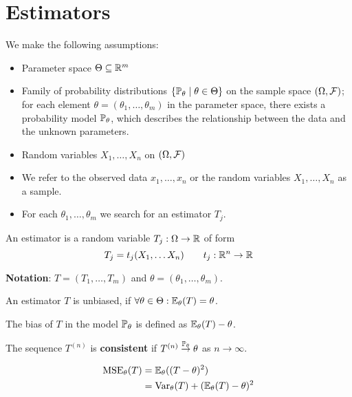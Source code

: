 \section{Estimators}
We make the following assumptions:
\begin{itemize}
  \item Parameter space \(\Theta \subseteq \R^m\)
  \item Family of probability distributions \(\{\P_\theta \mid \theta \in \Theta\}\) on the sample space \((\O, \F)\); for each element \(\theta = (\theta_1, \ldots, \theta_m)\) in the parameter space, there exists a probability model \(\P_\theta\), which describes the relationship between the data and the unknown parameters.
  \item Random variables \(X_1, \ldots, X_n\) on \((\O, \mathcal{F})\)
  \item We refer to the observed data \(x_1, \ldots, x_n\) or the random variables \(X_1, \ldots, X_n\) as a sample.
  \item For each \(\theta_1, \ldots, \theta_m\) we search for an estimator \(T_j\).
\end{itemize}

\begin{definition*}[Estimator]
  An estimator is a random variable \(T_j: \O \to \R\) of form
  \[T_j = t_j(X_1, \ldots X_n) \qquad t_j: \R^n \to \R\]
\end{definition*}

\textbf{Notation}: \(T = (T_1, \ldots, T_m)\) and \(\theta = (\theta_1, \ldots, \theta_m)\).

\begin{definition*}[Unbiased]
  An estimator \(T\) is unbiased, if \(\forall \theta \in \Theta: \E_\theta(T) = \theta\).
\end{definition*}

\begin{definition*}[Bias]
  The bias of \(T\) in the model \(\P_\theta\) is defined as \(\E_\theta(T) - \theta\).
\end{definition*}

\begin{definition*}[Consistent]
  The sequence \(T^{(n)}\) is \textbf{consistent} if \(T^{(n)} \stackrel{\P_\theta}{\to}\theta\) as \(n \to \infty\).
\end{definition*}

\begin{definition*}
  \begin{align*}
    \MSE_\theta(T) &= \E_\theta((T-\theta)^2) \\
    &= \Var_\theta(T) + (\E_\theta(T) - \theta)^2
  \end{align*}
\end{definition*}


